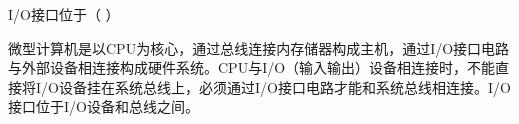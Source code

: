 \question I/O接口位于（ ）
\par{}
\begin{solution}微型计算机是以CPU为核心，通过总线连接内存储器构成主机，通过I/O接口电路与外部设备相连接构成硬件系统。CPU与I/O（输入输出）设备相连接时，不能直接将I/O设备挂在系统总线上，必须通过I/O接口电路才能和系统总线相连接。I/O接口位于I/O设备和总线之间。
\end{solution}

